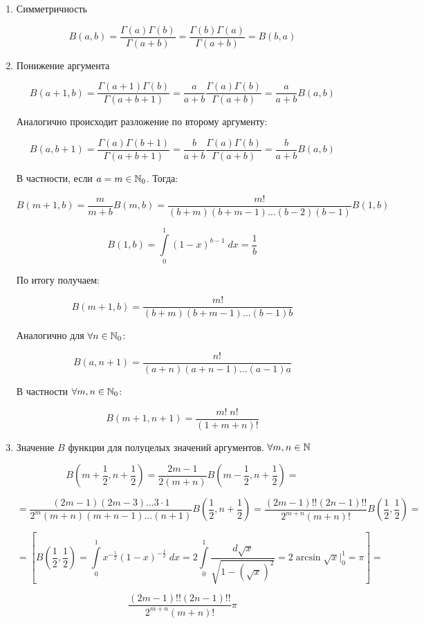 \documentclass[../../main.tex]{subfiles}
\begin{document}
\begin{enumerate}
	\item Симметричность 
	
	\[  B(a,b) = \frac{\Gamma(a) \Gamma(b)}{\Gamma(a+b)} = \frac{\Gamma(b)  \Gamma(a) }{\Gamma(a+b)} = B(b,a)   \]
	
	\item Понижение аргумента
	
	\[   B(a+1,b) = \frac{\Gamma(a+1) \Gamma(b)}{\Gamma(a+b+1)}  = \frac{a}{a+b} \frac{\Gamma(a) \Gamma(b)}{\Gamma(a+b)}  = \frac{a}{a+b}  B(a,b) \]
	
	Аналогично происходит разложение по второму аргументу:
	
	\[  B(a,b+1) =  \frac{\Gamma(a) \Gamma(b+1)}{\Gamma(a+b+1)}  = \frac{b}{a+b} \frac{\Gamma(a) \Gamma(b)}{\Gamma(a+b)}  = \frac{b}{a+b}  B(a,b)   \]
	
	В частности, если $a=m \in \mathbb{N}_0$. Тогда:
	
	\[  B(m+1,b) = \frac{m}{m+b} B(m,b) = \frac{m!}{(b+m)(b+m-1)\dots(b-2)(b-1)} B(1,b)  \]
	
	\[ B(1,b) = \int\limits_{0}^{1} \left( 1-x \right) ^{b-1} \; dx = \frac{1}{b} \]
	
	По итогу получаем:
	
	\[  B(m+1,b) = \frac{m!}{(b+m)(b+m-1)\dots(b-1)b}     \]
	
	Аналогично для $\forall n \in \mathbb{N}_0$:
	
	\[  B(a,n+1) = \frac{n!}{(a+n)(a+n-1)\dots(a-1)a}  \]
	
	В частности $\forall m,n \in \mathbb{N}_0$:
	
	\[  B(m+1,n+1) = \frac{m! \; n!}{(1+m+n)!}   \]
	
	\item Значение $B$ функции для полуцелых значений аргументов. $\forall m,n \in \mathbb{N}$
		
	\[  B\left( m+\frac{1}{2}, n+\frac{1}{2} \right) = \frac{2m - 1}{2(m+n)} B\left( m-\frac{1}{2}, n+\frac{1}{2} \right) = \]
	
	\[ = \frac{(2m-1)(2m-3) \dots 3 \cdot 1}{2^m (m+n)(m+n-1)\dots (n+1)} B\left( \frac{1}{2}, n+\frac{1}{2} \right) = \frac{(2m-1)!! (2n-1)!! }{2^{m+n} (m+n)!} B\left( \frac{1}{2}, \frac{1}{2} \right) =  \]
	
	\[ = \left[  B\left( \frac{1}{2}, \frac{1}{2} \right) = \int\limits_{0}^{1} x^{-\frac{1}{2}} \left( 1-x \right)^{-\frac{1}{2}} \; dx = 2 \int\limits_{0}^{1} \frac{d \sqrt{x} }{\sqrt{1 - \left(\sqrt{x} \right)^2 }} = 2 \arcsin{\sqrt{x}} \bigg|_{0}^{1} = \pi  \right] =     \]
	
	\[   \frac{(2m-1)!! (2n-1)!! }{2^{m+n} (m+n)!} \pi    \]
\end{enumerate}
\end{document}
